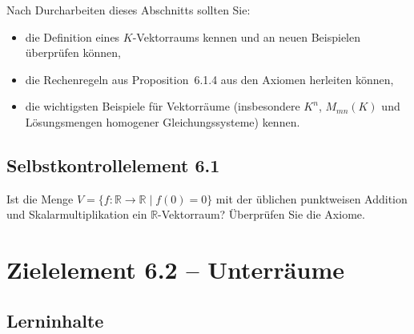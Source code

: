 \documentclass[a4paper,12pt]{article}
\begin{document}
Nach Durcharbeiten dieses Abschnitts sollten Sie:
\begin{itemize}
  \item die Definition eines $K$-Vektorraums kennen und an neuen Beispielen
        überprüfen können,
  \item die Rechenregeln aus Proposition~6.1.4 aus den Axiomen herleiten können,
  \item die wichtigsten Beispiele für Vektorräume (insbesondere $K^n$, $M_{mn}(K)$
        und Lösungsmengen homogener Gleichungssysteme) kennen.
\end{itemize}

\subsection*{Selbstkontrollelement 6.1}

Ist die Menge $V = \{f : \mathbb{R} \to \mathbb{R} \mid f(0) = 0\}$ mit der üblichen
punktweisen Addition und Skalarmultiplikation ein $\mathbb{R}$-Vektorraum?
Überprüfen Sie die Axiome.

\newpage

\section*{Zielelement 6.2 -- Unterräume}

\subsection*{Lerninhalte}

\begin{center}
\end{center}
\end{document}
